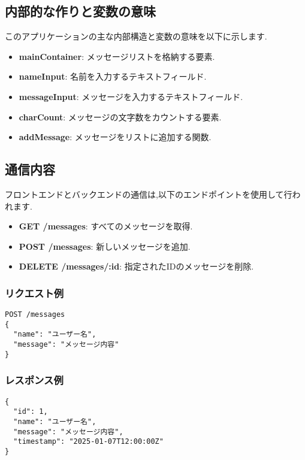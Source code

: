 \documentclass[uplatex,dvipdfmx]{jsarticle}
\begin{document}
\subsection{内部的な作りと変数の意味}
このアプリケーションの主な内部構造と変数の意味を以下に示します.
\begin{itemize}
    \item \textbf{mainContainer}: メッセージリストを格納する要素.
    \item \textbf{nameInput}: 名前を入力するテキストフィールド.
    \item \textbf{messageInput}: メッセージを入力するテキストフィールド.
    \item \textbf{charCount}: メッセージの文字数をカウントする要素.
    \item \textbf{addMessage}: メッセージをリストに追加する関数.
\end{itemize}

\subsection{通信内容}
フロントエンドとバックエンドの通信は,以下のエンドポイントを使用して行われます.
\begin{itemize}
    \item \textbf{GET /messages}: すべてのメッセージを取得.
    \item \textbf{POST /messages}: 新しいメッセージを追加.
    \item \textbf{DELETE /messages/:id}: 指定されたIDのメッセージを削除.
\end{itemize}

\subsubsection{リクエスト例}
\begin{verbatim}
POST /messages
{
  "name": "ユーザー名",
  "message": "メッセージ内容"
}
\end{verbatim}

\subsubsection{レスポンス例}
\begin{verbatim}
{
  "id": 1,
  "name": "ユーザー名",
  "message": "メッセージ内容",
  "timestamp": "2025-01-07T12:00:00Z"
}
\end{verbatim}
\end{document}
